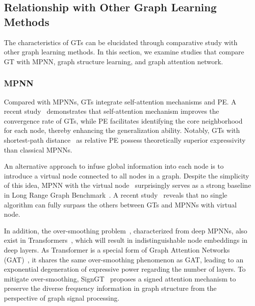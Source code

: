 \subsection{Relationship with Other Graph Learning Methods}
\label{theory:relationship}
The characteristics of GTs can be elucidated through comparative study with other graph learning methods. In this section, we examine studies that compare GT with MPNN, graph structure learning, and graph attention network.

\subsubsection{MPNN}
Compared with MPNNs, GTs integrate self-attention mechanisms and PE. A recent study~\cite{li2024what} demonstrates that self-attention mechanism improves the convergence rate of GTs, while PE facilitates identifying the core neighborhood for each node, thereby enhancing the generalization ability. Notably, GTs with shortest-path distance~\cite{black2024comparing} as relative PE possess theoretically superior expressivity than classical MPNNs. 

An alternative approach to infuse global information into each node is to introduce a virtual node connected to all nodes in a graph. 
Despite the simplicity of this idea, MPNN with the virtual node~\cite{cai2023connection} surprisingly serves as a strong baseline in Long Range Graph Benchmark~\cite{dwivedi2022long}. A recent study~\cite{rosenbluth2024distinguished} reveals that no single algorithm can fully surpass the others between GTs and MPNNs with virtual node. 

In addition, the over-smoothing problem~\cite{chen2020measuring}, characterized from deep MPNNs, also exist in Transformers~\cite{shi2022revisiting}, which will result in indistinguishable node embeddings in deep layers.
As Transformer is a special form of Graph Attention Networks (GAT)~\cite{velivckovic2017graph}, it shares the same over-smoothing phenomenon as GAT, 
leading to an exponential degeneration of expressive power regarding the number of layers. 
To mitigate over-smoothing, SignGT~\cite{chen2023signgtsignedattentionbasedgraph} proposes a signed attention mechanism to preserve the  diverse frequency information in graph structure from the perspective of graph signal processing.



